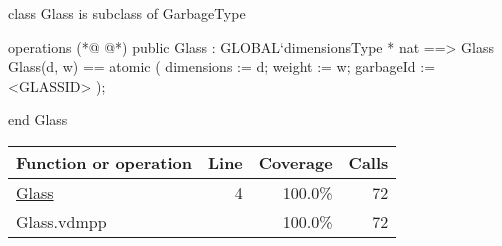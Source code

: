 \begin{vdmpp}[breaklines=true]
class Glass is subclass of GarbageType

operations
(*@
\label{Glass:4}
@*)
public Glass : GLOBAL`dimensionsType * nat ==> Glass
Glass(d, w) == 
    atomic 
    (
        dimensions := d;
        weight := w;
        garbageId := <GLASSID>
    );

end Glass
\end{vdmpp}
\bigskip
\begin{longtable}{|l|r|r|r|}
\hline
Function or operation & Line & Coverage & Calls \\
\hline
\hline
\hyperref[Glass:4]{Glass} & 4&100.0\% & 72 \\
\hline
\hline
Glass.vdmpp & & 100.0\% & 72 \\
\hline
\end{longtable}

